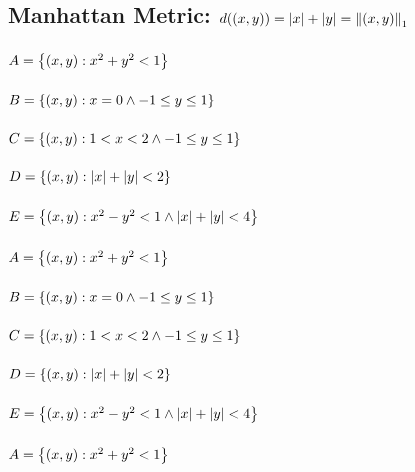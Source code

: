 \documentclass[]{article}
\begin{document}
\subsection{Manhattan Metric: $d((x,y)) = \abs{x} + \abs{y} = \norm{(x,y)}_1$}
\subsubsection{$A = \qty{(x,y) : x^2 + y^2 < 1}$}
\subsubsection{$B = \qty{(x,y) : x = 0 \land -1 \leq y \leq 1}$}
\subsubsection{$C = \qty{(x,y) : 1 < x < 2 \land -1 \leq y \leq 1}$}
\subsubsection{$D = \qty{(x,y) : \abs{x} + \abs{y} < 2}$}
\subsubsection{$E = \qty{(x,y) : x^2 - y^2 < 1 \land \abs{x} + \abs{y} < 4}$}


\subsubsection{$A = \qty{(x,y) : x^2 + y^2 < 1}$}
\subsubsection{$B = \qty{(x,y) : x = 0 \land -1 \leq y \leq 1}$}
\subsubsection{$C = \qty{(x,y) : 1 < x < 2 \land -1 \leq y \leq 1}$}
\subsubsection{$D = \qty{(x,y) : \abs{x} + \abs{y} < 2}$}
\subsubsection{$E = \qty{(x,y) : x^2 - y^2 < 1 \land \abs{x} + \abs{y} < 4}$}


\subsubsection{$A = \qty{(x,y) : x^2 + y^2 < 1}$}
\end{document}

